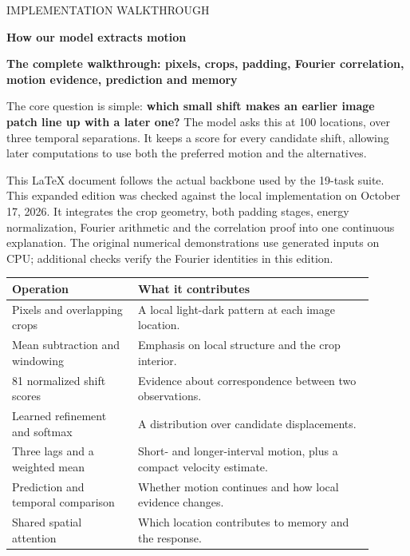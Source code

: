 \documentclass[11pt,letterpaper]{article}
\begin{document}
\fontsize{10.5}{13.6}\selectfont
\color{navy}
\label{guide}

{\color{teal}\small\sffamily IMPLEMENTATION WALKTHROUGH\par}\medskip

{\sffamily\bfseries\fontsize{27}{32}\selectfont How our model extracts motion\par}\bigskip

\textbf{The complete walkthrough: pixels, crops, padding, Fourier correlation, motion evidence, prediction and memory}


The core question is simple: \textbf{which small shift makes an earlier image patch line up with a later one?} The model asks this at 100 locations, over three temporal separations. It keeps a score for every candidate shift, allowing later computations to use both the preferred motion and the alternatives.


This LaTeX document follows the actual backbone used by the 19-task suite. This expanded edition was checked against the local implementation on October 17, 2026. It integrates the crop geometry, both padding stages, energy normalization, Fourier arithmetic and the correlation proof into one continuous explanation. The original numerical demonstrations use generated inputs on CPU; additional checks verify the Fourier identities in this edition.


\begin{center}\small\renewcommand{\arraystretch}{1.16}\setlength{\tabcolsep}{4pt}\begin{tabular}{p{0.316\linewidth}p{0.584\linewidth}}\toprule

\textbf{Operation} & \textbf{What it contributes} \\

\midrule

Pixels and overlapping crops & A local light-dark pattern at each image location. \\

Mean subtraction and windowing & Emphasis on local structure and the crop interior. \\

81 normalized shift scores & Evidence about correspondence between two observations. \\

Learned refinement and softmax & A distribution over candidate displacements. \\

Three lags and a weighted mean & Short- and longer-interval motion, plus a compact velocity estimate. \\

Prediction and temporal comparison & Whether motion continues and how local evidence changes. \\

Shared spatial attention & Which location contributes to memory and the response. \\

\bottomrule\end{tabular}\end{center}
\end{document}
